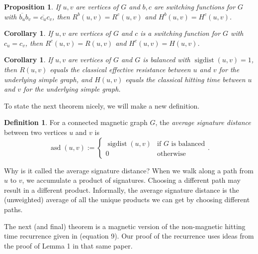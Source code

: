 \documentclass{article}
\newtheorem{prop}[thm]{Proposition}
\newtheorem{corollary}[thm]{Corollary}
\theoremstyle{definition}
\newtheorem{defn}[thm]{Definition}
\DeclareMathOperator{\sigdist}{sigdist}
\DeclareMathOperator{\asd}{asd}
\begin{document}
\begin{prop}
If $u, v$ are vertices of $G$ and $b, c$ are switching functions for $G$ with $\overline{b_u}b_v = \overline{c_u}c_v$, then $R^b (u, v) = R^c (u, v)$ and $H^b (u, v) = H^c (u, v)$.
\end{prop}

\begin{corollary}
If $u, v$ are vertices of $G$ and $c$ is a switching function for $G$ with $c_u = c_v$, then $R^c (u, v) = R(u, v)$ and $H^c (u, v) = H(u, v)$. \end{corollary}

\begin{corollary}
If $u, v$ are vertices of $G$ and $G$ is balanced with $\sigdist(u, v) = 1$, then $R(u, v)$ equals the classical effective resistance between $u$ and $v$ for the underlying simple graph, and $H(u, v)$ equals the classical hitting time between $u$ and $v$ for the underlying simple graph. \end{corollary}

To state the next theorem nicely, we will make a new definition.   
\begin{defn}
For a connected magnetic graph $G$, the \textit{average signature distance} between two vertices $u$ and $v$ is
$$
\asd(u, v) := \begin{cases}
\sigdist(u, v) &\mbox{if $G$ is balanced} \\
0 &\mbox{otherwise}
\end{cases}.
$$
\end{defn}
Why is it called the average signature distance? When we walk along a path from $u$ to $v$, we accumulate a product of signatures. Choosing a different path may result in a different product. Informally, the average signature distance is the (unweighted) average of all the unique products we can get by choosing different paths.

The next (and final) theorem is a magnetic version of the non-magnetic hitting time recurrence given in \cite{pagerankrandomwalks} (equation 9). Our proof of the recurrence uses ideas from the proof of Lemma 1 in that same paper.
\end{document}

